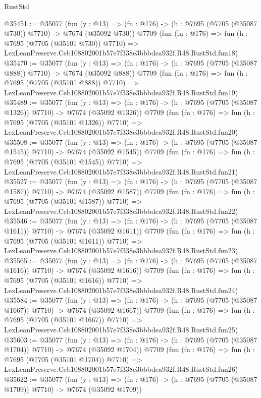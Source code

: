 \begin{lexlean}{RustStd}
\begin{coremodule}
@35451 := @35077
    (fun (y : @13) => (fn : @176) -> (h : @7695 (@7705 (@35087 @730)) @7710) -> @7674 (@35092 @730))
    @7709
    (fun (fn : @176) =>
    fun (h : @7695 (@7705 (@35101 @730)) @7710) =>
    LexLeanPreserve.Ceb108802001b57e7f338e3bbbdea932f.R48.RustStd.fun18)
@35470 := @35077
    (fun (y : @13) => (fn : @176) -> (h : @7695 (@7705 (@35087 @888)) @7710) -> @7674 (@35092 @888))
    @7709
    (fun (fn : @176) =>
    fun (h : @7695 (@7705 (@35101 @888)) @7710) =>
    LexLeanPreserve.Ceb108802001b57e7f338e3bbbdea932f.R48.RustStd.fun19)
@35489 := @35077
    (fun (y : @13) =>
    (fn : @176) -> (h : @7695 (@7705 (@35087 @1326)) @7710) -> @7674 (@35092 @1326))
    @7709
    (fun (fn : @176) =>
    fun (h : @7695 (@7705 (@35101 @1326)) @7710) =>
    LexLeanPreserve.Ceb108802001b57e7f338e3bbbdea932f.R48.RustStd.fun20)
@35508 := @35077
    (fun (y : @13) =>
    (fn : @176) -> (h : @7695 (@7705 (@35087 @1545)) @7710) -> @7674 (@35092 @1545))
    @7709
    (fun (fn : @176) =>
    fun (h : @7695 (@7705 (@35101 @1545)) @7710) =>
    LexLeanPreserve.Ceb108802001b57e7f338e3bbbdea932f.R48.RustStd.fun21)
@35527 := @35077
    (fun (y : @13) =>
    (fn : @176) -> (h : @7695 (@7705 (@35087 @1587)) @7710) -> @7674 (@35092 @1587))
    @7709
    (fun (fn : @176) =>
    fun (h : @7695 (@7705 (@35101 @1587)) @7710) =>
    LexLeanPreserve.Ceb108802001b57e7f338e3bbbdea932f.R48.RustStd.fun22)
@35546 := @35077
    (fun (y : @13) =>
    (fn : @176) -> (h : @7695 (@7705 (@35087 @1611)) @7710) -> @7674 (@35092 @1611))
    @7709
    (fun (fn : @176) =>
    fun (h : @7695 (@7705 (@35101 @1611)) @7710) =>
    LexLeanPreserve.Ceb108802001b57e7f338e3bbbdea932f.R48.RustStd.fun23)
@35565 := @35077
    (fun (y : @13) =>
    (fn : @176) -> (h : @7695 (@7705 (@35087 @1616)) @7710) -> @7674 (@35092 @1616))
    @7709
    (fun (fn : @176) =>
    fun (h : @7695 (@7705 (@35101 @1616)) @7710) =>
    LexLeanPreserve.Ceb108802001b57e7f338e3bbbdea932f.R48.RustStd.fun24)
@35584 := @35077
    (fun (y : @13) =>
    (fn : @176) -> (h : @7695 (@7705 (@35087 @1667)) @7710) -> @7674 (@35092 @1667))
    @7709
    (fun (fn : @176) =>
    fun (h : @7695 (@7705 (@35101 @1667)) @7710) =>
    LexLeanPreserve.Ceb108802001b57e7f338e3bbbdea932f.R48.RustStd.fun25)
@35603 := @35077
    (fun (y : @13) =>
    (fn : @176) -> (h : @7695 (@7705 (@35087 @1704)) @7710) -> @7674 (@35092 @1704))
    @7709
    (fun (fn : @176) =>
    fun (h : @7695 (@7705 (@35101 @1704)) @7710) =>
    LexLeanPreserve.Ceb108802001b57e7f338e3bbbdea932f.R48.RustStd.fun26)
@35622 := @35077
    (fun (y : @13) =>
    (fn : @176) -> (h : @7695 (@7705 (@35087 @1709)) @7710) -> @7674 (@35092 @1709))

\end{coremodule}
\end{lexlean}

